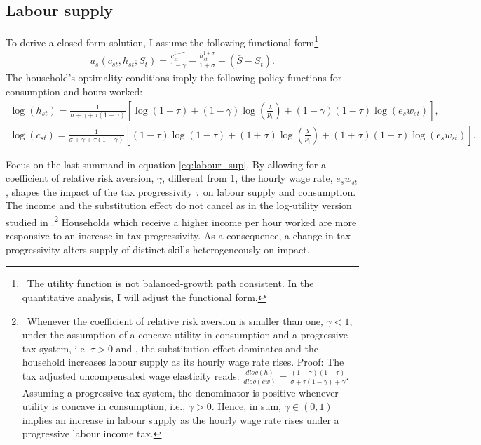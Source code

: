 \subsection{Labour supply}
To derive a closed-form solution, I assume the following functional form\footnote{\ The utility function is not balanced-growth path consistent. In the quantitative analysis, I will adjust the functional form.}
\begin{align}
u_s(c_{st},h_{st};S_t)=
\frac{c_{st}^{1-\gamma}}{1-\gamma}-
\frac{h_{st}^{1+\sigma}}{1+\sigma}-
(\bar{S}-S_t).
\end{align}
The household's optimality conditions imply the following policy functions for consumption and hours worked:
\begin{align}
\log(h_{st})= \frac{1}{\sigma+\gamma+\tau(1-\gamma)}\left[\log(1-\tau)+(1-\gamma)\log\left(\frac{\lambda}{p_{t}}\right)+(1-\gamma)(1-\tau)\log(e_sw_{st})\right],\label{eq:labour_sup}\\
\log(c_{st})= \frac{1}{\sigma +\gamma +\tau(1-\gamma)}\left[(1-\tau)\log(1-\tau)+(1+\sigma)\log\left(\frac{\lambda}{p_{t}}\right)+(1+\sigma)(1-\tau)\log(e_sw_{st})\right].
\end{align}

Focus on the last summand in equation \ref{eq:labour_sup}.
By allowing for a coefficient of relative risk aversion, $\gamma$, different from 1, the hourly wage rate, $e_sw_{st}$, shapes the impact of the tax progressivity $\tau$ on labour supply and consumption. The income and the substitution effect do not cancel as in the log-utility version studied in \cite{Heathcote2017OptimalFramework}.\footnote{\ Whenever the coefficient of relative risk aversion is smaller than one, $\gamma<1$, under the assumption of a concave utility in consumption and a progressive tax system, i.e. $\tau>0$ and ,  the substitution effect dominates and the household 
	increases labour supply as its hourly wage rate rises. Proof: The tax adjusted uncompensated wage elasticity reads: $\frac{d log(h)}{d log(ew)}= \frac{(1-\gamma)(1-\tau)}{\sigma+\tau(1-\gamma)+\gamma}$.  Assuming a progressive tax system, the denominator is positive whenever utility is concave in consumption, i.e., $\gamma>0$. Hence, in sum, $\gamma\in\left(0,1\right)$ implies an increase in labour supply as the hourly wage rate rises under a progressive labour income tax. } 
Households which receive a higher income per hour worked are more responsive to an increase in tax progressivity. As a consequence, a change in tax progressivity alters supply of distinct skills heterogeneously on impact. 
